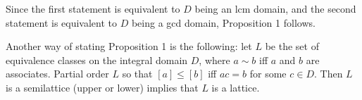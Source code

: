 \documentclass[12pt]{article}
\newcommand{\GCD}{\operatorname{GCD}}
\newcommand{\LCM}{\operatorname{LCM}}
\begin{document}
Since the first statement is equivalent to $D$ being an lcm domain, and the second statement is equivalent to $D$ being a gcd domain, Proposition 1 follows.

Another way of stating Proposition 1 is the following: let $L$ be the set of equivalence classes on the integral domain $D$, where $a\sim b$ iff $a$ and $b$ are associates.  Partial order $L$ so that $[a]\le [b]$ iff $ac=b$ for some $c\in D$.  Then $L$ is a semilattice (upper or lower) implies that $L$ is a lattice.

\end{document}
